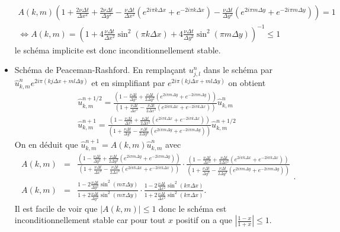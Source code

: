 \documentclass[12pt,a4paper]{article}
\begin{document}
\begin{itemize}
$$
\begin{array}{l}
\displaystyle A(k,m)  \left(1 + \frac{2\nu\Delta t}{\Delta x^2}  + \frac{2\nu\Delta t}{\Delta y^2} - \frac{\nu\Delta t}{\Delta x^2} (e^{2i\pi k \Delta x}+e^{-2i\pi k\Delta x})-\frac{\nu\Delta t}{\Delta y^2} (e^{2i\pi m\Delta y}+e^{-2i\pi m\Delta y}) \right) =1\\
\Leftrightarrow \displaystyle A(k,m) = \left(1 + 4 \frac{\nu\Delta t}{\Delta x^2} \sin^2(\pi k\Delta x) + 4 \frac{\nu\Delta t}{\Delta y^2} \sin^2(\pi m\Delta y)\right)^{-1}  \le 1
\end{array}
$$
le schéma implicite est donc inconditionnellement stable.
\item Schéma de Peaceman-Rashford. En remplaçant $u^n_{j,l}$ dans le schéma par $\hat u^n_{k,m}e^{2i\pi(kj\Delta x +ml\Delta y)}$ et en simplifiant par $e^{2i\pi(kj\Delta x +ml\Delta y)}$ on obtient
$$
\begin{array}{l}
\displaystyle \hat{u}^{n+1/2}_{k,m}   =  \frac{\left(1 -  \frac{\nu\Delta t}{\Delta y^2} +\frac{\nu\Delta t}{2\Delta y^2} (e^{2i\pi m\Delta y}+e^{-2i\pi m\Delta y}) \right)}{\left(1 + \frac{\nu\Delta t}{\Delta x^2}   - \frac{\nu\Delta t}{2\Delta x^2} (e^{2i\pi k \Delta x}+e^{-2i\pi k\Delta x})\right) } \hat{u}^{n}_{k,m} \\[3ex]
\displaystyle \hat{u}^{n+1}_{k,m}  = \frac{ \left(1 -  \frac{\nu\Delta t}{\Delta x^2} +\frac{\nu\Delta t}{2\Delta x^2} (e^{2i\pi k\Delta x}+e^{-2i\pi k\Delta x}) \right)}{ \left(1 + \frac{\nu\Delta t}{\Delta y^2}   - \frac{\nu\Delta t}{2\Delta y^2} (e^{2i\pi m \Delta y}+e^{-2i\pi m\Delta y})\right) } \hat{u}^{n+1/2}_{k,m}
\end{array}
$$
On en déduit que $\hat{u}^{n+1}_{k,m} = A(k,m) \hat{u}^{n}_{k,m}$ avec
$$
\begin{array}{rcl}
A(k,m) &= & \displaystyle \frac{\left(1 -  \frac{\nu\Delta t}{\Delta y^2} +\frac{\nu\Delta t}{2\Delta y^2} (e^{2i\pi m\Delta y}+e^{-2i\pi m\Delta y}) \right)}{\left(1 + \frac{\nu\Delta t}{\Delta x^2}   - \frac{\nu\Delta t}{2\Delta x^2} (e^{2i\pi k \Delta x}+e^{-2i\pi k\Delta x})\right) } \cdot   \frac{ \left(1 -  \frac{\nu\Delta t}{\Delta x^2} +\frac{\nu\Delta t}{2\Delta x^2} (e^{2i\pi k\Delta x}+e^{-2i\pi k\Delta x}) \right)}{ \left(1 + \frac{\nu\Delta t}{\Delta y^2}   - \frac{\nu\Delta t}{2\Delta y^2} (e^{2i\pi m \Delta y}+e^{-2i\pi m\Delta y})\right) }\\
A(k,m) &= & \displaystyle \frac{1 -  2\frac{\nu\Delta t}{\Delta y^2} \sin^2(m\pi\Delta y) }{1 + 2\frac{\nu\Delta t}{\Delta y^2} \sin^2(m\pi\Delta y) } \cdot \frac{1 -  2\frac{\nu\Delta t}{\Delta x^2} \sin^2(k\pi\Delta x) }{1 + 2\frac{\nu\Delta t}{\Delta x^2} \sin^2(k\pi\Delta x) }. 
\end{array}. 
$$
Il est facile de voir que $|A(k,m)|\le 1$ donc le schéma est inconditionnellement stable car pour tout $x$ positif on a que $\left|\frac{1-x}{1+x}\right| \le 1$.


\end{itemize}
\end{document}
